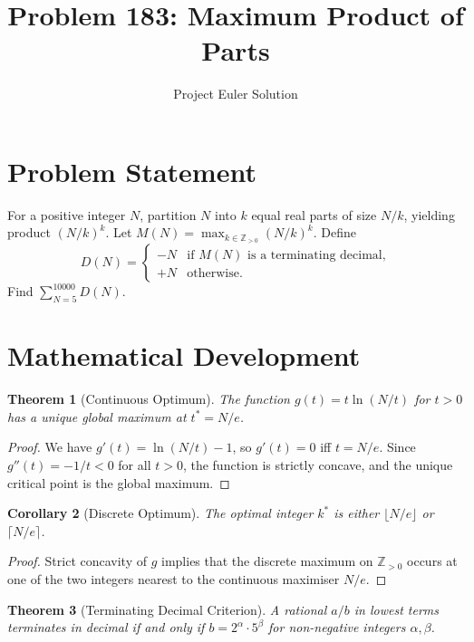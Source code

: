 \documentclass[12pt]{article}
\title{Problem 183: Maximum Product of Parts}
\author{Project Euler Solution}
\date{}
\newtheorem{theorem}{Theorem}
\newtheorem{corollary}[theorem]{Corollary}
\begin{document}
\maketitle

\section{Problem Statement}

For a positive integer $N$, partition $N$ into $k$ equal real parts of size $N/k$, yielding product $(N/k)^k$. Let $M(N) = \max_{k \in \mathbb{Z}_{>0}} (N/k)^k$. Define
\[
D(N) = \begin{cases} -N & \text{if } M(N) \text{ is a terminating decimal,} \\ +N & \text{otherwise.} \end{cases}
\]
Find $\displaystyle\sum_{N=5}^{10000} D(N)$.

\section{Mathematical Development}

\begin{theorem}[Continuous Optimum]
The function $g(t) = t \ln(N/t)$ for $t > 0$ has a unique global maximum at $t^* = N/e$.
\end{theorem}

\begin{proof}
We have $g'(t) = \ln(N/t) - 1$, so $g'(t) = 0$ iff $t = N/e$. Since $g''(t) = -1/t < 0$ for all $t > 0$, the function is strictly concave, and the unique critical point is the global maximum.
\end{proof}

\begin{corollary}[Discrete Optimum]
The optimal integer $k^*$ is either $\lfloor N/e \rfloor$ or $\lceil N/e \rceil$.
\end{corollary}

\begin{proof}
Strict concavity of $g$ implies that the discrete maximum on $\mathbb{Z}_{>0}$ occurs at one of the two integers nearest to the continuous maximiser $N/e$.
\end{proof}

\begin{theorem}[Terminating Decimal Criterion]
A rational $a/b$ in lowest terms terminates in decimal if and only if $b = 2^\alpha \cdot 5^\beta$ for non-negative integers $\alpha, \beta$.
\end{theorem}
\end{document}
